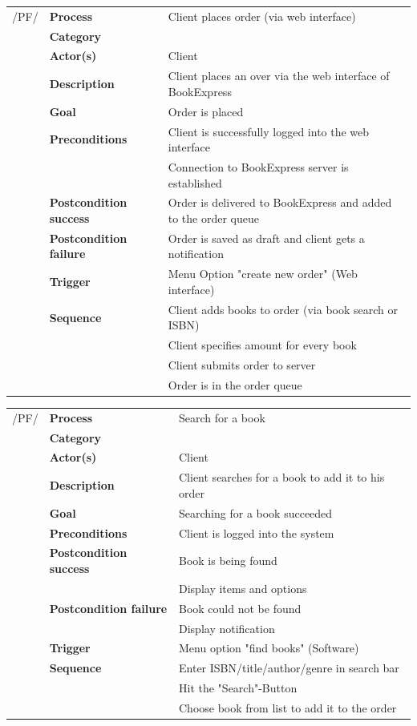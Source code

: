 \documentclass[11pt,a4paper,oneside,svgnames]{report}
\begin{document}
\begin{tabular}{llp{10cm}}
/PF/	& \textbf{Process} & Client places order (via web interface)\\ 
		& \textbf{Category} & \\
		& \textbf{Actor(s)} & Client\\ 
		& \textbf{Description}	 & Client places an over via the web interface of BookExpress\\ 
		& \textbf{Goal} & Order is placed\\
		& \textbf{Preconditions} & Client is successfully logged into the web interface\\
		& & Connection to BookExpress server is established\\
		& \textbf{Postcondition success} & Order is delivered to BookExpress  and added to the order queue\\
		& \textbf{Postcondition failure} & Order is saved as draft and client gets a notification\\
		& \textbf{Trigger} & Menu Option "create new order" (Web interface)\\
		& \textbf{Sequence} & Client adds books to order (via book search or ISBN)\\
		& & Client specifies amount for every book\\
		& & Client submits order to server\\
		& & Order is in the order queue\\

\end{tabular}

\begin{tabular}{p{1.5cm}p{3cm}p{8cm}}
	 /PF/	& \textbf{Process} & Search for a book\\ 
		& \textbf{Category} & \\
		& \textbf{Actor(s)} & Client\\ 
		& \textbf{Description}	 & Client searches for a book to add it to his order\\ 
		& \textbf{Goal} & Searching for a book succeeded\\
		& \textbf{Preconditions} & Client is logged into the system\\
		& \textbf{Postcondition success} & Book is being found\\
		& & Display items and options\\
		& \textbf{Postcondition failure} & Book could not be found\\
		& & Display notification\\
		& \textbf{Trigger} & Menu option "find books" (Software)\\
		& \textbf{Sequence} & Enter ISBN/title/author/genre in search bar\\
		& & Hit the "Search"-Button\\
		& & Choose book from list to add it to the order\\

\end{tabular}
\end{document}
